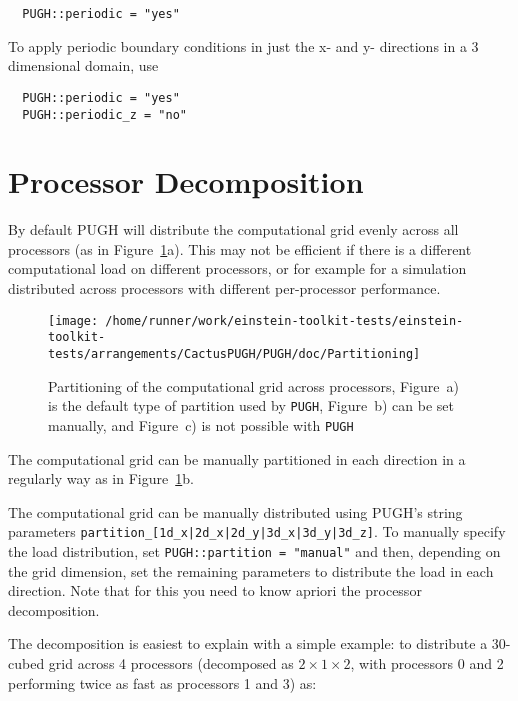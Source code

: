 \documentclass{article}
\begin{document}
\begin{verbatim}
  PUGH::periodic = "yes"
\end{verbatim}

To apply periodic boundary conditions in just the x- and y- directions in
a 3 dimensional domain, use

\begin{verbatim}
  PUGH::periodic = "yes"
  PUGH::periodic_z = "no"
\end{verbatim}


\section{Processor Decomposition}

By default PUGH will distribute the computational grid evenly across
all processors (as in Figure~\ref{pugh::fig2}a). This may not be
efficient if there is a different computational load on different
processors, or for example for a simulation distributed across
processors with different per-processor performance.

\begin{figure}[ht]
\begin{center}
\texttt{[image: /home/runner/work/einstein-toolkit-tests/einstein-toolkit-tests/arrangements/CactusPUGH/PUGH/doc/Partitioning]}
\end{center}
\caption[]{Partitioning of the computational grid across processors, Figure~a) is the default type of partition used by {\tt PUGH}, Figure~b) can be set
manually, and Figure~c) is not possible with {\tt PUGH}}
\label{pugh::fig2}
\end{figure}

The computational grid can be manually partitioned in each direction
in a regularly way as in Figure~\ref{pugh::fig2}b.

The computational grid can be manually distributed using PUGH's
string parameters \verb!partition_[1d_x|2d_x|2d_y|3d_x|3d_y|3d_z]!.
To manually specify the load distribution, set {\tt PUGH::partition = "manual"}
and then, depending on the grid dimension, set the remaining
parameters to distribute the load in each direction. Note that for
this you need to know apriori the processor decomposition.

The decomposition is easiest to explain with a simple example:
to distribute a 30-cubed grid across 4 processors (decomposed as $2 \times 1
\times 2$, with processors 0 and 2 performing twice as fast as processors 1
and 3) as:
\end{document}
